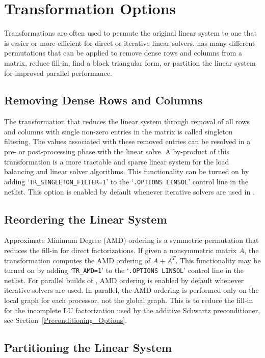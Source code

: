 \section{Transformation Options}
\label{Transformation_Options}

Transformations are often used to permute the original linear system to one that
is easier or more efficient for direct or iterative linear solvers.  \Xyce{} has many different permutations 
that can be applied to remove dense rows and columns from a matrix, reduce fill-in, find a block triangular form, 
or partition the linear system for improved parallel performance. 

\subsection{Removing Dense Rows and Columns}
The transformation that reduces the linear system through removal of all rows and 
columns with single non-zero entries in the matrix is called singleton filtering.  The values
associated with these removed entries can be resolved in a pre- or post-processing
phase with the linear solve.
A by-product of this transformation is a more tractable and sparse 
linear system for the load balancing and linear solver
algorithms.  This functionality can be turned on by adding 
`\texttt{TR\_SINGLETON\_FILTER=1}' to the `\texttt{.OPTIONS LINSOL}'
control line in the netlist.  This option is enabled by default whenever iterative
solvers are used in \Xyce{}.

\subsection{Reordering the Linear System}
Approximate Minimum Degree (AMD) ordering is a symmetric permutation that 
reduces the fill-in for direct factorizations.  If given a nonsymmetric
matrix $A$, the transformation computes the AMD ordering of $A + A^T$.  
This functionality may be turned on by adding `\texttt{TR\_AMD=1}' 
to the `\texttt{.OPTIONS LINSOL}' control line in the netlist. 
For parallel builds of \Xyce{}, AMD ordering is enabled by default whenever iterative solvers
are used.  In parallel, the AMD ordering is performed only on the local graph for
each processor, not the global graph.  This is to reduce the fill-in for the incomplete
LU factorization used by the additive Schwartz preconditioner, see Section~\ref{Preconditioning_Options}.

\subsection{Partitioning the Linear System}
\label{Partitioning_Linear_System}

